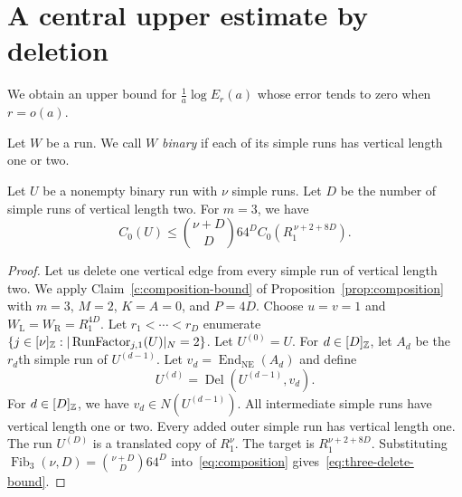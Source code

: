 \section{A central upper estimate by deletion}\label{sec:central-upper-deletion}
We obtain an upper bound for $\frac1a\log E_r(a)$ whose error tends to zero when $r=o(a)$.

\begin{definition}\label{sync:central-upper-deletion:4}
Let $W$ be a run. We call $W$ \textit{binary} if each of its simple runs
has vertical length one or two.
\end{definition}

\begin{lemma}\label{lem:three-delete}
Let $U$ be a nonempty binary run with $\nu$ simple runs.
Let $D$ be the number of simple runs of vertical length two.
For $m=3$, we have
\begin{equation}\label{eq:three-delete-bound}
 C_0(U)\le \binom{\nu+D}{D}64^D C_0(R_1^{\,\nu+2+8D}).
\end{equation}
\end{lemma}
\begin{proof}
Let us delete one vertical edge from every simple run of vertical length two.
We apply Claim~\ref{c:composition-bound} of Proposition~\ref{prop:composition} with $m=3$, $M=2$,
$K=A=0$, and $P=4D$.
Choose $u=v=1$ and $W_{\mathrm L}=W_{\mathrm R}=R_1^{4D}$.
Let $r_1<\cdots<r_D$ enumerate $\{j\in[\nu]_{\mathbb Z}:|\operatorname{RunFactor}_{j,1}(U)|_N=2\}$. Let $U^{(0)}=U$.
For $d\in[D]_{\mathbb Z}$, let $A_d$ be the $r_d$th simple run of $U^{(d-1)}$.
Let $v_d=\operatorname{End}_{\mathrm{NE}}(A_d)$ and define
\[
 U^{(d)}=\operatorname{Del}(U^{(d-1)},v_d).
\]
For $d\in[D]_{\mathbb Z}$, we have $v_d\in N(U^{(d-1)})$.
All intermediate simple runs have vertical length one or two.
Every added outer simple run has vertical length one.
The run $U^{(D)}$ is a translated copy of $R_1^\nu$.
The target is $R_1^{\nu+2+8D}$.
Substituting $\operatorname{Fib}_3(\nu,D)=\binom{\nu+D}{D}64^D$ into~\eqref{eq:composition} gives~\eqref{eq:three-delete-bound}.
\end{proof}

